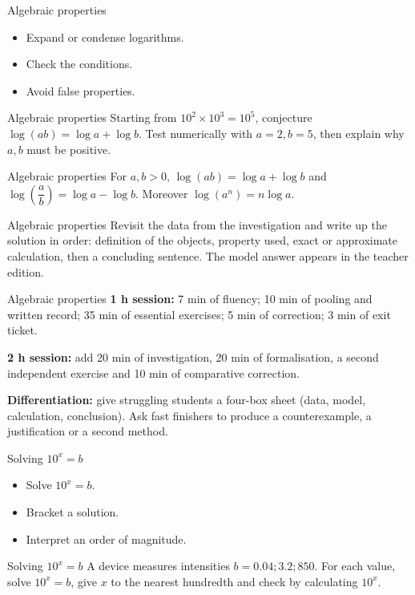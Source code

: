 \documentclass[aspectratio=169,10pt]{beamer}
\begin{document}
\begin{frame}{Algebraic properties}
\begin{itemize}
\item Expand or condense logarithms.
\item Check the conditions.
\item Avoid false properties.

\end{itemize}
\end{frame}
\begin{frame}{Algebraic properties}
Starting from \(10^2\times10^3=10^5\), conjecture \(\log(ab)=\log a+\log b\). Test numerically with \(a=2,b=5\), then explain why \(a,b\) must be positive.
\end{frame}
\begin{frame}{Algebraic properties}
For \(a,b>0\), \(\log(ab)=\log a+\log b\) and \(\log\!\left(\dfrac ab\right)=\log a-\log b\). Moreover \(\log(a^n)=n\log a\).
\end{frame}
\begin{frame}{Algebraic properties}
Revisit the data from the investigation and write up the solution in order: definition of the objects, property used, exact or approximate calculation, then a concluding sentence. The model answer appears in the teacher edition.
\end{frame}
\begin{frame}{Algebraic properties}
\textbf{1 h session:} 7 min of fluency; 10 min of pooling and written record; 35 min of essential exercises; 5 min of correction; 3 min of exit ticket.

\textbf{2 h session:} add 20 min of investigation, 20 min of formalisation, a second independent exercise and 10 min of comparative correction.

\textbf{Differentiation:} give struggling students a four-box sheet (data, model, calculation, conclusion). Ask fast finishers to produce a counterexample, a justification or a second method.
\end{frame}
\begin{frame}{Solving \(10^x=b\)}
\begin{itemize}
\item Solve \(10^x=b\).
\item Bracket a solution.
\item Interpret an order of magnitude.

\end{itemize}
\end{frame}
\begin{frame}{Solving \(10^x=b\)}
A device measures intensities \(b=0.04;3.2;850\). For each value, solve \(10^x=b\), give \(x\) to the nearest hundredth and check by calculating \(10^x\).
\end{frame}
\end{document}
